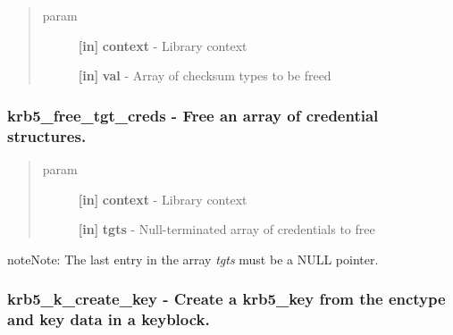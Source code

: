 \documentclass[letterpaper,10pt,english]{sphinxmanual}
\begin{document}
\begin{quote}\begin{description}
\item[{param}] \leavevmode
\textbf{{[}in{]}} \textbf{context} - Library context

\textbf{{[}in{]}} \textbf{val} - Array of checksum types to be freed

\end{description}\end{quote}


\subsubsection{krb5\_free\_tgt\_creds -  Free an array of credential structures.}
\label{appdev/refs/api/krb5_free_tgt_creds::doc}\label{appdev/refs/api/krb5_free_tgt_creds:krb5-free-tgt-creds-free-an-array-of-credential-structures}

\begin{fulllineitems}
\label{appdev/refs/api/krb5_free_tgt_creds:krb5_free_tgt_creds}
\end{fulllineitems}

\begin{quote}\begin{description}
\item[{param}] \leavevmode
\textbf{{[}in{]}} \textbf{context} - Library context

\textbf{{[}in{]}} \textbf{tgts} - Null-terminated array of credentials to free

\end{description}\end{quote}

\begin{notice}{note}{Note:}
The last entry in the array \emph{tgts} must be a NULL pointer.
\end{notice}


\subsubsection{krb5\_k\_create\_key -  Create a krb5\_key from the enctype and key data in a keyblock.}
\label{appdev/refs/api/krb5_k_create_key::doc}\label{appdev/refs/api/krb5_k_create_key:krb5-k-create-key-create-a-krb5-key-from-the-enctype-and-key-data-in-a-keyblock}
\end{document}
